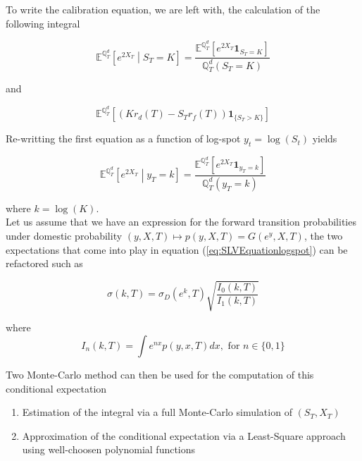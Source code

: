 \documentclass{article}
\begin{document}
\noindent To write the calibration equation, we are left with, the calculation of the following integral

\begin{equation}
	\mathbb{E}^{\mathbb{Q}_T^d}\left[e^{2X_T}\middle| S_T=K\right] = \frac{\mathbb{E}^{\mathbb{Q}_T^d}\left[e^{2X_T} \textbf{1}_{S_T=K}\right]}{\mathbb{Q}_T^d(S_T = K)}
\end{equation}

\noindent and 

\begin{equation}
	\label{eq:SLVEquationstochRates}
	\mathbb{E}^{\mathbb{Q}_T^d} \left[ \left(K r_d(T) - S_T r_f(T)\right) \textbf{1}_{\{S_T > K\}}\right] 
\end{equation}

\noindent Re-writting the first equation as a function of log-spot $y_t = \log\left(S_t\right)$ yields

\begin{equation}
	\label{eq:SLVEquationlogspot}
	\mathbb{E}^{\mathbb{Q}_T^d}\left[e^{2X_T}\middle| y_T=k\right] = \frac{\mathbb{E}^{\mathbb{Q}_T^d}\left[e^{2X_T} \textbf{1}_{y_T=k}\right]}{\mathbb{Q}_T^d(y_T = k)}
\end{equation}

\noindent where $k = \log(K)$.\\

\noindent Let us assume that we have an expression for the forward transition probabilities under domestic probability $(y,X,T) \mapsto p(y,X,T) = G(e^y,X,T)$, the two expectations that come into play in equation (\ref{eq:SLVEquationlogspot}) can be refactored such as

\begin{equation}
	\label{eq:calibrationlocalvolSLV}
	\sigma(k,T) = \sigma_D(e^k, T) \sqrt{\frac{I_0(k,T)}{I_1(k,T)}}
\end{equation}

\noindent where
\begin{equation}
	\label{eq:Inintegral}
	I_n(k,T) = \int e^{nx} p(y,x,T) dx, \text{ for } n \in \{0,1\}
\end{equation}

\noindent Two Monte-Carlo method can then be used for the computation of this conditional expectation

\begin{enumerate}
	\item Estimation of the integral via a full Monte-Carlo simulation of $(S_T,X_T)$
	\item Approximation of the conditional expectation via a Least-Square approach using well-choosen polynomial functions
\end{enumerate}
\end{document}
